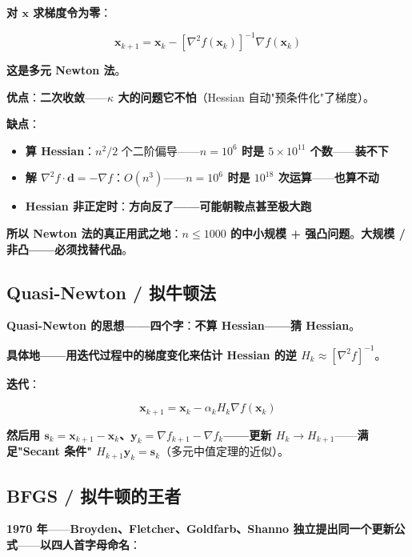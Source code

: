 \textbf{对 $\bm x$ 求梯度令为零}：

\begin{equation}
\boxed{\, \bm x_{k+1} = \bm x_k - [\nabla^2 f(\bm x_k)]^{-1} \nabla f(\bm x_k) \,}
\end{equation}

\textbf{这是\textbf{多元 Newton 法}}。

\textbf{优点}：\textbf{二次收敛}——\textbf{$\kappa$ 大的问题它不怕}（Hessian 自动"预条件化"了梯度）。

\textbf{缺点}：

\begin{itemize}
\item \textbf{算 Hessian}：$n^2/2$ 个二阶偏导——\textbf{$n=10^6$ 时是 $5\times 10^{11}$ 个数}——\textbf{装不下}
\item \textbf{解 $\nabla^2 f \cdot \bm d = -\nabla f$}：$O(n^3)$——\textbf{$n=10^6$ 时是 $10^{18}$ 次运算}——\textbf{也算不动}
\item \textbf{Hessian 非正定时}：\textbf{方向反了——可能朝鞍点甚至极大跑}
\end{itemize}

\textbf{所以 Newton 法的真正用武之地}：\textbf{$n \le 1000$ 的中小规模 + 强凸问题}。\textbf{大规模 / 非凸——必须找替代品}。

\subsection{Quasi-Newton / 拟牛顿法}

\textbf{Quasi-Newton 的思想——四个字}：\textbf{不算 Hessian——猜 Hessian}。

\textbf{具体地——用迭代过程中的\textbf{梯度变化}来\textbf{估计} Hessian 的逆 $H_k \approx [\nabla^2 f]^{-1}$}。

\textbf{迭代}：

\begin{equation}
\bm x_{k+1} = \bm x_k - \alpha_k H_k \nabla f(\bm x_k)
\end{equation}

\textbf{然后用 $\bm s_k = \bm x_{k+1} - \bm x_k$、$\bm y_k = \nabla f_{k+1} - \nabla f_k$——更新 $H_k \to H_{k+1}$}——\textbf{满足"\textbf{Secant 条件}" $H_{k+1} \bm y_k = \bm s_k$}（多元中值定理的近似）。

\subsection{BFGS / 拟牛顿的王者}

\textbf{1970 年}——\textbf{Broyden、Fletcher、Goldfarb、Shanno \textbf{独立}提出同一个更新公式}——\textbf{以四人首字母命名}：


